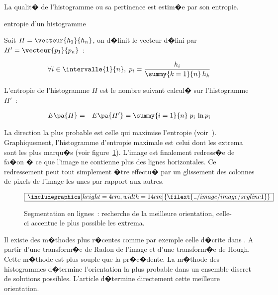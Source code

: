 La qualit� de l'histogramme ou sa pertinence est estim�e par son entropie.



        \begin{xdefinition}{entropie d'un histogramme}
        
        Soit $H = \vecteur{h_1}{h_n}$, on d�finit le vecteur d�fini par $H' = \vecteur{p_1}{p_n}$~:
        
                    $$
                    \forall i \in \intervalle{1}{n}, \; p_i =  \frac{h_i} { \summy{k=1}{n} \, h_k }
                    $$
        
        L'entropie de l'histogramme $H$ est le nombre suivant calcul� sur l'histogramme $H'$~:
        
                    \begin{eqnarray}
                    E\pa{H} &=& E\pa{H'} = \summy{i=1}{n} \; p_i \, \ln p_i
                    \end{eqnarray}
        
        \end{xdefinition}


La direction la plus probable est celle qui maximise l'entropie (voir~). Graphiquement, l'histogramme d'entropie maximale est celui dont les extrema sont les plus marqu�s (voir figure~\ref{image_segline_direction}).
L'image est finalement redress�e de fa�on � ce que l'image ne contienne plus des lignes horizontales. Ce redressement peut tout simplement �tre effectu� par un glissement des colonnes de pixels de l'image les unes par rapport aux autres. 


            \begin{figure}[t]
        $$\frame{$\begin{array}[c]{c}\includegraphics[height=4cm, width=14cm]
        {\filext{../image/image/segline1}}\end{array}$}$$
        \caption{    Segmentation en lignes~: recherche de la meilleure orientation, celle-ci accentue 
                            le plus possible les extrema.}
        \label{image_segline_direction}
            \end{figure}


Il existe des m�thodes plus r�centes comme par exemple celle d�crite dans . A partir d'une transform�e de Radon de l'image et d'une transform�e de Hough. Cette m�thode est plus souple que la pr�c�dente. La m�thode des histogrammes d�termine l'orientation la plus probable dans un ensemble discret de solutions possibles. L'article  d�termine directement cette meilleure orientation.




